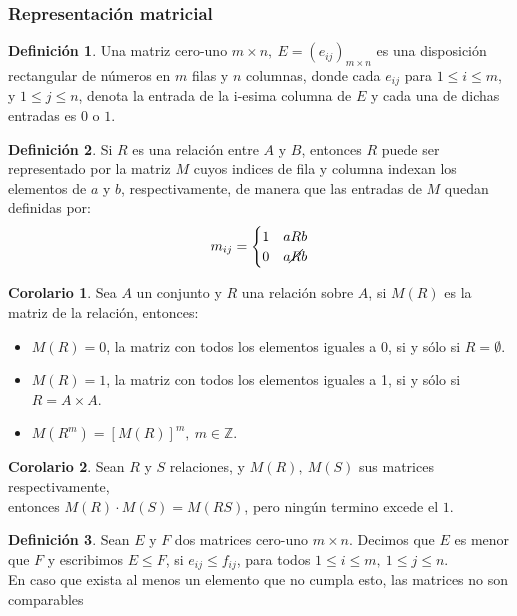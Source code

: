\documentclass[10pt]{article}
\theoremstyle{definition}
\newtheorem{definition}{Definición}[section]
\newtheorem{corollary}{Corolario}[theorem]
\begin{document}
    \subsubsection{Representación matricial}
    \begin{definition}
        Una matriz cero-uno $m\times n,\ E=(e_{ij})_{m\times n}$ es una disposición rectangular de números en $m$ filas y $n$ columnas, donde cada $e_{ij}$ para $1\le i\le m$, y $1\le j\le n$, denota la entrada de la i-esima columna de $E$ y cada una de dichas entradas es $0$ o $1$.
    \end{definition}
    \begin{definition}
        Si $R$ es una relación entre $A$ y $B$, entonces $R$ puede ser representado por la matriz $M$ cuyos indices de fila y columna indexan los elementos de $a$ y $b$, respectivamente, de manera que las entradas de $M$ quedan definidas por:$$m_{ij}=\begin{cases}1 & aRb\\0 & a\cancel{R}b\end{cases}$$
    \end{definition}
    \begin{corollary}
        Sea $A$ un conjunto y $R$ una relación sobre $A$, si $M(R)$ es la matriz de la relación, entonces:
        \begin{itemize}
            \item $M(R)=0$, la matriz con todos los elementos iguales a 0, si y sólo si $R=\emptyset$.
            \item $M(R)=1$, la matriz con todos los elementos iguales a 1, si y sólo si $R=A\times A$.
            \item $M(R^m)=[M(R)]^m,\ m\in\mathbb{Z}$.
        \end{itemize}
    \end{corollary}
    \begin{corollary}
        Sean $R$ y $S$ relaciones, y $M(R),\ M(S)$ sus matrices respectivamente,\\ entonces $M(R)\cdot M(S)=M(RS)$, pero ningún termino excede el $1$.
    \end{corollary}
    \begin{definition}
        Sean $E$ y $F$ dos matrices cero-uno $m\times n$. Decimos que $E$ es menor que $F$ y escribimos $E\le F$, si $e_{ij}\le f_{ij}$, para todos $1\le i\le m,\ 1\le j\le n$.\\
        En caso que exista al menos un elemento que no cumpla esto, las matrices no son comparables
    \end{definition}
\end{document}
